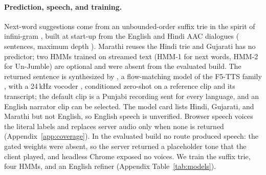 \paragraph{Prediction, speech, and training.}
Next-word suggestions come from an unbounded-order suffix trie in the spirit of infini-gram \citep{liu2024infinigram}, built at start-up from the English and Hindi AAC dialogues (\IGSent{} sentences, maximum depth \IGDepth{}).
Marathi reuses the Hindi trie and Gujarati has no predictor; two HMMs trained on streamed text (HMM-1 for next words, HMM-2 for Un-Jumble) are optional and were absent from the evaluated build.
The returned sentence is synthesized by \indicf{} \citep{ai4bharat2025indicf5}, a flow-matching model of the F5-TTS family \citep{chen2025f5tts}, with a 24\,kHz \vocos{} vocoder \citep{siuzdak2023vocos}, conditioned zero-shot on a reference clip and its transcript; the default clip is a Punjabi recording sent for every language, and an English narrator clip can be selected.
The model card lists Hindi, Gujarati, and Marathi but not English, so English speech is unverified.
Browser speech voices the literal labels and replaces server audio only when none is returned (Appendix~\ref{app:coverage}).
In the evaluated build no route produced speech: the gated weights were absent, so the server returned a placeholder tone that the client played, and headless Chrome exposed no voices.
We train the suffix trie, four HMMs, and an English \flant{} refiner (Appendix Table~\ref{tab:models}).
